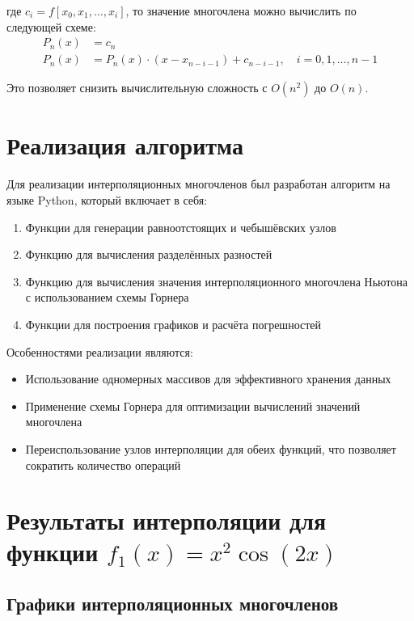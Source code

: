 \documentclass[12pt]{article}
\begin{document}
где $c_i = f[x_0, x_1, \ldots, x_i]$, то значение многочлена можно вычислить по следующей схеме:
\begin{align}
    P_n(x) &= c_n \\
    P_n(x) &= P_n(x) \cdot (x - x_{n-i-1}) + c_{n-i-1}, \quad i = 0, 1, \ldots, n-1
\end{align}

Это позволяет снизить вычислительную сложность с $O(n^2)$ до $O(n)$.

\section{Реализация алгоритма}

Для реализации интерполяционных многочленов был разработан алгоритм на языке Python, который включает в себя:

\begin{enumerate}
    \item Функции для генерации равноотстоящих и чебышёвских узлов
    \item Функцию для вычисления разделённых разностей
    \item Функцию для вычисления значения интерполяционного многочлена Ньютона с использованием схемы Горнера
    \item Функции для построения графиков и расчёта погрешностей
\end{enumerate}

Особенностями реализации являются:
\begin{itemize}
    \item Использование одномерных массивов для эффективного хранения данных
    \item Применение схемы Горнера для оптимизации вычислений значений многочлена
    \item Переиспользование узлов интерполяции для обеих функций, что позволяет сократить количество операций
\end{itemize}

\section{Результаты интерполяции для функции $f_1(x) = x^2\cos(2x)$}

\subsection{Графики интерполяционных многочленов}
\end{document}
